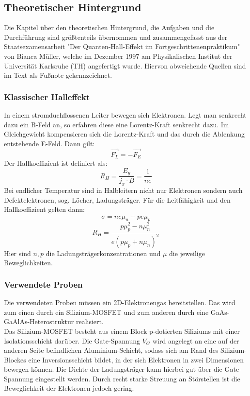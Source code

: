 \subsection{Theoretischer Hintergrund}
Die Kapitel über den theoretischen Hintergrund, die Aufgaben und die Durchführung sind größtenteils übernommen und zusammengefasst aus der Staatsexamensarbeit "Der Quanten-Hall-Effekt im Fortgeschrittenenpraktikum"{} von Bianca Müller, welche im Dezember 1997 am Physikalischen Institut der Universität Karlsruhe (TH) angefertigt wurde. Hiervon abweichende Quellen sind im Text als Fußnote gekennzeichnet.
\subsubsection{Klassischer Halleffekt}
In einem stromduchflossenen Leiter bewegen sich Elektronen. Legt man senkrecht dazu ein B-Feld an, so erfahren diese eine Lorentz-Kraft senkrecht dazu. Im Gleichgewicht kompensieren sich die Lorentz-Kraft und das durch die Ablenkung entstehende E-Feld. Dann gilt:
$$\vec{F_L} = - \vec{F_E} $$
Der Hallkoeffizient ist definiert als:
$$ R_H = \frac{E_y}{j_x \cdot B} = \frac{1}{n e}$$
Bei endlicher Temperatur sind in Halbleitern nicht nur Elektronen sondern auch Defektelektronen, sog. Löcher, Ladungsträger. Für die Leitfähigkeit und den Hallkoeffizient gelten dann:
$$\sigma = ne\mu _n + pe\mu_p $$
$$R_H = \frac{p \mu _p ^{2} - n \mu _n ^{2}}{e(p\mu_p + n \mu _n)^{2}} $$
Hier sind $n,p$ die Ladungsträgerkonzentrationen und $\mu$ die jeweilige Beweglichkeiten.
\subsubsection{Verwendete Proben}
Die verwendeten Proben müssen ein 2D-Elektronengas bereitstellen. Das wird zum einen durch ein Silizium-MOSFET und zum anderen durch eine GaAs-GaAlAs-Heterostruktur realisiert.\\

Das Silizium-MOSFET besteht aus einem Block p-dotierten Siliziums mit einer Isolationsschicht darüber. Die Gate-Spannung $V_G$ wird angelegt an eine auf der anderen Seite befindlichen Aluminium-Schicht, sodass sich am Rand des Silizium-Blockes eine Inversionsschicht bildet, in der sich Elektronen in zwei Dimensionen bewegen können. Die Dichte der Ladungsträger kann hierbei gut über die Gate-Spannung eingestellt werden. Durch recht starke Streuung an Störstellen ist die Beweglichkeit der Elektronen jedoch gering. \\

